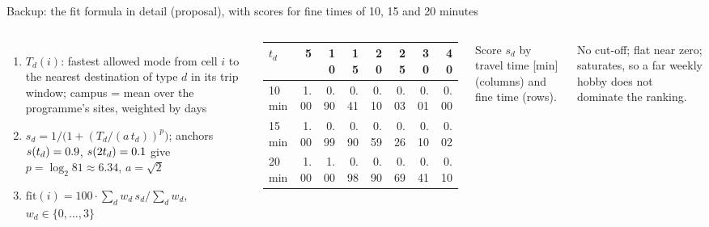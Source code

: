 \documentclass[aspectratio=169,10pt]{beamer}
\begin{document}
\begin{frame}{Backup: the fit formula in detail (proposal), with scores for fine times of 10, 15
  and 20 minutes}
  \begin{columns}[T,onlytextwidth]
      \begin{enumerate}\footnotesize
        \item $T_d(i)$: fastest allowed mode from cell $i$ to the nearest destination of type
              $d$ in its trip window; campus = mean over the programme's sites, weighted by days
        \item $s_d = 1/\bigl(1+(T_d/(a\,t_d))^p\bigr)$; anchors $s(t_d)=0.9$,
              $s(2t_d)=0.1$ give $p=\log_2 81\approx 6.34$, $a=\sqrt2$
        \item $\mathrm{fit}(i)=100\cdot\sum_d w_d\,s_d/\sum_d w_d$, $w_d\in\{0,\dots,3\}$
      \end{enumerate}
      \scriptsize
      \begin{tabular}{@{}lrrrrrrr@{}}
        \toprule
        $t_d$ & 5 & 10 & 15 & 20 & 25 & 30 & 40 \\
        \midrule
        10 min & 1.00 & 0.90 & 0.41 & 0.10 & 0.03 & 0.01 & 0.00 \\
        15 min & 1.00 & 0.99 & 0.90 & 0.59 & 0.26 & 0.10 & 0.02 \\
        20 min & 1.00 & 1.00 & 0.98 & 0.90 & 0.69 & 0.41 & 0.10 \\
        \bottomrule
      \end{tabular}\par\smallskip
      {\color{muted}Score $s_d$ by travel time [min] (columns) and fine time (rows).}\par
      \medskip
      \footnotesize No cut-off; flat near zero; saturates, so a far weekly hobby does not
      dominate the ranking.
  \end{columns}
\end{frame}
\end{document}
